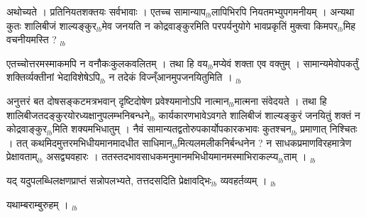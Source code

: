 \documentclass[article,12pt,a4paper]{memoir}%
\newcounter{parCount}
\begin{document}
	  \pstart \leavevmode%
	अथोच्यते । प्रतिनियतशक्तयः सर्व\leavevmode{}भावाः । एतच्च सामान्याप{\tiny $_{lb}$}लापिभिरपि नियतमभ्युपगमनीयम् । अन्यथा कुतः शालिबीजं शाल्यङ्कुर{\tiny $_{lb}$}मेव जनयति न कोद्रवाङ्कुरमिति परपर्यनुयोगे भावप्रकृतिं मुक्त्वा किमपर{\tiny $_{lb}$}मिह वचनीयमस्ति ?
	{}
	\pend%
      {\tiny $_{lb}$}

	  \pstart \leavevmode%
	एतच्चोत्तरमस्माकमपि न वनौकःकुलकवलितम् । तथा हि वय{\tiny $_{lb}$}मप्येवं शक्ता एव वक्तुम् । सामान्यमेवोपकर्तुं शक्तिर्व्यक्तीनां भेदाविशेषेऽपि{\tiny $_{lb}$} न तदेकं विज्न्ँआनमुपजनयितुमिति ।
	{}
	\pend%
      {\tiny $_{lb}$}

	  \pstart \leavevmode%
	अनुत्तरं बत दोषसङ्कटमत्रभवान् दृष्टिदोषेण प्रवेश्यमानोऽपि नात्मान{\tiny $_{lb}$}मात्मना संवेदयते । तथा हि शालिबीजतदङ्कुरयोरध्यक्षानुपलम्भनिबन्धने{\tiny $_{lb}$} कार्यकारणभावेऽवगते शालिबीजं शाल्यङ्कुरं जनयितुं शक्तं न कोद्रवाङ्कुर{\tiny $_{lb}$}मिति शक्यमभिधातुम् । नैवं सामान्यतद्वतोरुपकार्योपकारकभावः कुतश्चन{\tiny $_{lb}$} \leavevmode{} प्रमाणात् निश्चितः । तत् कथमिदमुत्तरमभिधीयमानमादधीत साधिमान{\tiny $_{lb}$}मित्यलमलीकनिर्बन्धनेन ? न साधकप्रमाणविरहमात्रेण प्रेक्षावताम्{\tiny $_{lb}$} असद्व्यवहारः । ततस्तदभावसाधकमनुमानमभिधीयमानमस्माभिराकल्प्य{\tiny $_{lb}$}ताम् ।
	{}
	\pend%
      {\tiny $_{lb}$}

	  \pstart \leavevmode%
	यद् यदुपलब्धिलक्षणप्राप्तं सन्नोपलभ्यते, तत्तदसदिति प्रेक्षावद्भिः{\tiny $_{lb}$} व्यवहर्तव्यम् ।
	{}
	\pend%
      {\tiny $_{lb}$}

	  \pstart \leavevmode%
	यथाम्बराम्बुरुहम् ।
	{}
	\pend%
      {\tiny $_{lb}$}
\end{document}
